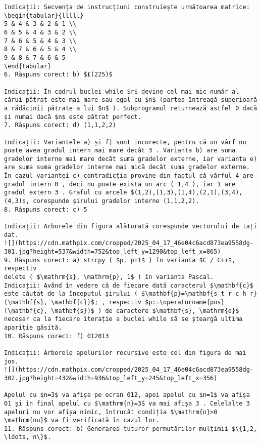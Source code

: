\begin{verbatim}
Indicații: Secvența de instrucțiuni construiește următoarea matrice:
\begin{tabular}{lllll}
5 & 4 & 3 & 2 & 1 \\
6 & 5 & 4 & 3 & 2 \\
7 & 6 & 5 & 4 & 3 \\
8 & 7 & 6 & 5 & 4 \\
9 & 8 & 7 & 6 & 5
\end{tabular}
6. Răspuns corect: b) $£(225)$

Indicații: În cadrul buclei while $r$ devine cel mai mic număr al cărui pătrat este mai mare sau egal cu $n$ (partea întreagă superioară a rădăcinii pătrate a lui $n$ ). Subprogramul returnează astfel 0 dacă și numai dacă $n$ este pătrat perfect.
7. Răspuns corect: d) (1,1,2,2)

Indicații: Variantele a) și f) sunt incorecte, pentru că un vârf nu poate avea gradul intern mai mare decât 3 . Varianta b) are suma gradelor interne mai mare decât suma gradelor externe, iar varianta e) are suma suma gradelor interne mai mică decât suma gradelor externe. În cazul variantei c) contradicția provine din faptul că vârful 4 are gradul intern 0 , deci nu poate exista un arc ( 1,4 ), iar 1 are gradul extern 3 . Graful cu arcele $(1,2),(1,3),(1,4),(2,1),(3,4),(4,3)$, corespunde șirului gradelor interne (1,1,2,2).
8. Răspuns corect: c) 5

Indicații: Arborele din figura alăturată corespunde vectorului de tați dat.
![](https://cdn.mathpix.com/cropped/2025_04_17_46e04c6acd873ea9558dg-301.jpg?height=537&width=752&top_left_y=1290&top_left_x=865)
9. Răspuns corect: a) strcpy ( $p, p+1$ ) în varianta $C / C++$, respectiv
delete ( $\mathrm{s}, \mathrm{p}, 1$ ) în varianta Pascal.
Indicații: Având în vedere că de fiecare dată caracterul $\mathbf{c}$ este căutat de la începutul șirului ( $\mathbf{p}=\mathbf{s t r c h r}(\mathbf{s}, \mathbf{c})$; , respectiv $p:=\operatorname{pos}(\mathbf{c}, \mathbf{s})$ ) de caractere $\mathbf{s}, \mathrm{e}$ necesar ca la fiecare iterație a buclei while să se șteargă ultima apariție găsită.
10. Răspuns corect: f) 012013

Indicații: Arborele apelurilor recursive este cel din figura de mai jos.
![](https://cdn.mathpix.com/cropped/2025_04_17_46e04c6acd873ea9558dg-302.jpg?height=432&width=936&top_left_y=245&top_left_x=356)

Apelul cu $n=3$ va afișa pe ecran 012, apoi apelul cu $n=1$ va afișa 01 și în final apelul cu $\mathrm{n}=3$ va mai afișa 3 . Celelalte 3 apeluri nu vor afișa nimic, întrucât condiția $\mathrm{n}>0 \mathrm{nu}$ va fi verificată în cazul lor.
11. Răspuns corect: b) Generarea tuturor permutărilor mulțimii $\{1,2, \ldots, n\}$.


\end{verbatim}
